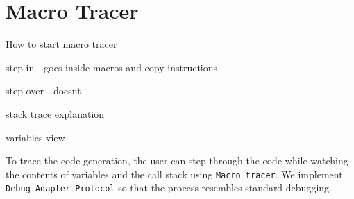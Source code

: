 

\section{Macro Tracer}

How to start macro tracer

step in - goes inside macros and copy instructions

step over - doesnt

stack trace explanation

variables view



To trace the code generation, the user can step through the code while watching the contents of variables and the call stack using \texttt{Macro tracer}. We implement \texttt{Debug Adapter Protocol} so that the process resembles standard debugging.